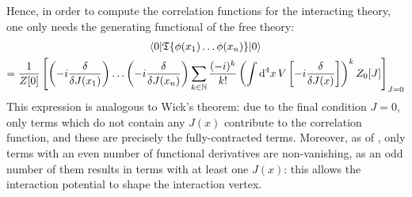 Hence, in order to compute the correlation functions for the interacting theory, one only needs the generating functional of the free theory:
\begin{multline}
  \braket{0 | \mathfrak{T}\{\phi(x_1) \dots \phi(x_n)\} | 0} \\
  = \frac{1}{Z[0]} \left[ \left( -i \frac{\delta}{\delta J(x_1)} \right) \dots \left( -i \frac{\delta}{\delta J(x_n)} \right) \sum_{k \in \mathbb{N}} \frac{(-i)^k}{k!} \left( \int \mathrm{d}^4x\, V \left[ -i \frac{\delta}{\delta J(x)} \right] \right)^k Z_0[J] \right]_{J = 0}
\end{multline}
This expression is analogous to Wick's theorem: due to the final condition $ J = 0 $, only terms which do not contain any $ J(x) $ contribute to the correlation function, and these are precisely the fully-contracted terms. Moreover, as of , only terms with an even number of functional derivatives are non-vanishing, as an odd number of them results in terms with at least one $ J(x) $: this allows the interaction potential to shape the interaction vertex.

